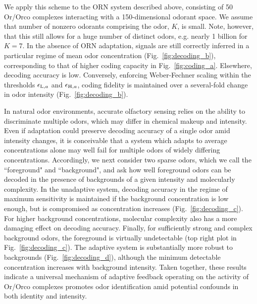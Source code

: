 \documentclass[9pt,twocolumn,twoside,lineno]{pnas-new}
\begin{document}
We apply this scheme to the ORN system described above, consisting of 50 Or/Orco complexes interacting with a 150-dimensional odorant space. We assume that number of nonzero odorants comprising the odor, $K$, is small. Note, however, that this still allows for a huge number of distinct odors, e.g. nearly 1 billion for $K= 7$. In the absence of ORN adaptation, signals are still correctly inferred in a particular regime of mean odor concentration (Fig.~\ref{fig:decoding_b}), corresponding to that of higher coding capacity in Fig.~\ref{fig:coding_a}.  Elsewhere, decoding accuracy is low. Conversely, enforcing Weber-Fechner scaling within the thresholds  $\epsilon_{\textup{L}, a}$ and $\epsilon_{\textup{H}, a}$, coding fidelity is  maintained over a several-fold change in odor intensity (Fig.~\ref{fig:decoding_b}).

In natural odor environments, accurate olfactory sensing relies on the ability to discriminate multiple odors, which may differ in chemical makeup and intensity. Even if adaptation could preserve decoding accuracy of a single odor amid intensity changes, it is conceivable that a system which adapts to average concentrations alone may well fail for multiple odors of widely differing concentrations. Accordingly,  we next consider two sparse odors, which we call the ``foreground" and ``background", and ask how well foreground odors can be decoded in the presence of backgrounds of a given intensity and molecularly complexity. In the unadaptive system, decoding accuracy in the regime of maximum sensitivity is maintained if the background concentration is low enough, but is  compromised as concentration increases (Fig.~\ref{fig:decoding_c}). For higher background concentrations, molecular complexity also has a more damaging effect on decoding accuracy. Finally, for sufficiently strong and complex background odors, the foreground is virtually undetectable (top right plot in Fig.~\ref{fig:decoding_c}). The adaptive system is substantially more robust to  backgrounds (Fig.~\ref{fig:decoding_d}), although the minimum detectable concentration increases with background intensity. Taken together, these results indicate a universal mechanism of adaptive  feedback operating on the activity of Or/Orco complexes promotes odor identification  amid potential confounds in both identity and intensity.


\end{document}
